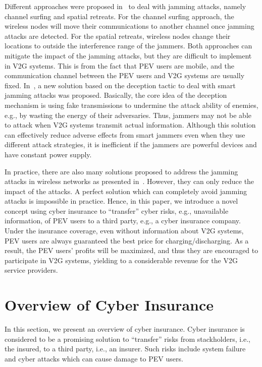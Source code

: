 \documentclass[twocolumn,10pt]{IEEEtran}
\begin{document}
Different approaches were proposed in~\cite{Xu2004Channel} to deal with jamming attacks, namely channel surfing and spatial retreats. For the channel surfing approach, the wireless nodes will move their communications to another channel once jamming attacks are detected. For the spatial retreats, wireless nodes change their locations to outside the interference range of the jammers. Both approaches can mitigate the impact of the jamming attacks, but they are difficult to implement in V2G systems. This is from the fact that PEV users are mobile, and the communication channel between the PEV users and V2G systems are usually fixed. In~\cite{Hoang2015Performance}, a new solution based on the deception tactic to deal with smart jamming attacks was proposed. Basically, the core idea of the deception mechanism is using fake transmissions to undermine the attack ability of enemies, e.g., by wasting the energy of their adversaries. Thus, jammers may not be able to attack when V2G systems transmit actual information. Although this solution can effectively reduce adverse effects from smart jammers even when they use different attack strategies, it is inefficient if the jammers are powerful devices and have constant power supply. 

In practice, there are also many solutions proposed to address the jamming attacks in wireless networks as presented in~\cite{Pelechrinis2011Denial}. However, they can only reduce the impact of the attacks. A perfect solution which can completely avoid jamming attacks is impossible in practice. Hence, in this paper, we introduce a novel concept using cyber insurance to ``transfer'' cyber risks, e.g., unavailable information, of PEV users to a third party, e.g., a cyber insurance company. Under the insurance coverage, even without information about V2G systems, PEV users are always guaranteed the best price for charging/discharging. As a result, the PEV users' profits will be maximized, and thus they are encouraged to participate in V2G systems, yielding to a considerable revenue for the V2G service providers. 




\section{Overview of Cyber Insurance}%
\label{sec:O_CI}

In this section, we present an overview of cyber insurance. Cyber insurance is considered to be a promising solution to ``transfer'' risks from stackholders, i.e., the insured, to a third party, i.e., an insurer. Such risks include system failure and cyber attacks which can cause damage to PEV users. 
\end{document}
